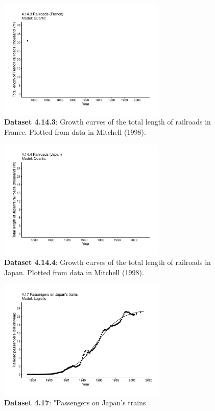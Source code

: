 \documentclass[aps,rmp,preprint,superscriptaddress,10pt,onecolumn]{article}
\begin{document}
\begin{figure}[h]
\includegraphics[width=8cm]{output/figs-ggplot/4.14.3.pdf}
\caption{\textbf{Dataset 4.14.3}: Growth curves of the total length of railroads in France. Plotted from data in Mitchell (1998).}
\end{figure}
	
\begin{figure}[h]
\includegraphics[width=8cm]{output/figs-ggplot/4.14.4.pdf}
\caption{\textbf{Dataset 4.14.4}: Growth curves of the total length of railroads in Japan. Plotted from data in Mitchell (1998).}
\end{figure}
	
\begin{figure}[h]
\includegraphics[width=8cm]{output/figs-ggplot/4.17.pdf}
\caption{\textbf{Dataset 4.17}: "Passengers on Japan's trains}
\end{figure}
	
\end{document}
